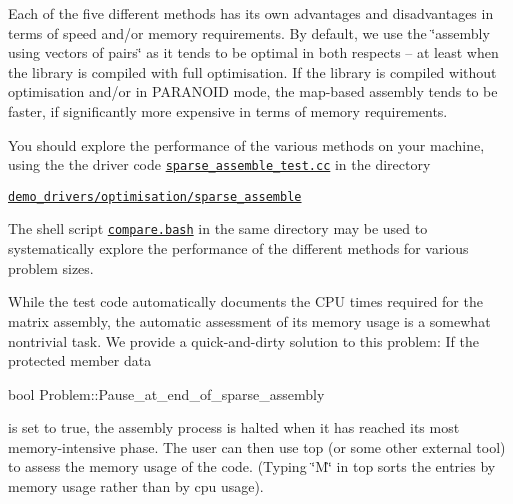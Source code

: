 Each of the five different methods has its own advantages and disadvantages in terms of speed and/or memory requirements. By default, we use the \char`\"{}assembly using vectors of pairs\char`\"{} as it tends to be optimal in both respects -- at least when the library is compiled with full optimisation. If the library is compiled without optimisation and/or in {\ttfamily P\+A\+R\+A\+N\+O\+ID} mode, the map-\/based assembly tends to be faster, if significantly more expensive in terms of memory requirements.

You should explore the performance of the various methods on your machine, using the the driver code \href{../../../demo_drivers/optimisation/sparse_assemble/sparse_assemble_test.cc}{\tt sparse\+\_\+assemble\+\_\+test.\+cc} in the directory

\begin{center} \href{../../../demo_drivers/optimisation/sparse_assemble/}{\tt demo\+\_\+drivers/optimisation/sparse\+\_\+assemble} \end{center} 

The shell script \href{../../../demo_drivers/optimisation/sparse_assemble/compare.bash}{\tt compare.\+bash} in the same directory may be used to systematically explore the performance of the different methods for various problem sizes.

While the test code automatically documents the C\+PU times required for the matrix assembly, the automatic assessment of its memory usage is a somewhat nontrivial task. We provide a quick-\/and-\/dirty solution to this problem\+: If the protected member data


\begin{DoxyCode}
\textcolor{keywordtype}{bool} Problem::Pause\_at\_end\_of\_sparse\_assembly
\end{DoxyCode}


is set to true, the assembly process is halted when it has reached its most memory-\/intensive phase. The user can then use {\ttfamily top} (or some other external tool) to assess the memory usage of the code. (Typing \char`\"{}\+M\char`\"{} in {\ttfamily top} sorts the entries by memory usage rather than by cpu usage).



